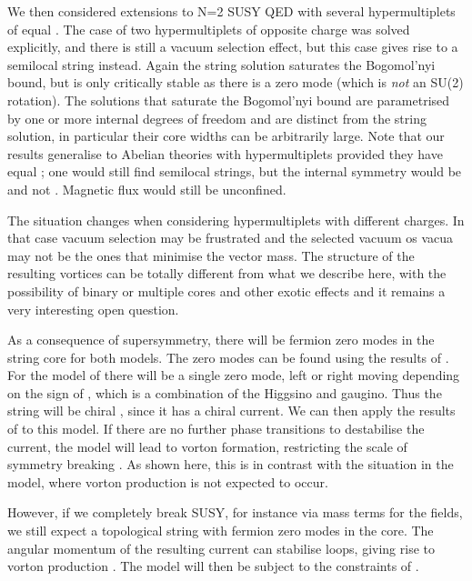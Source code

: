 \documentclass[a4paper,aps,prd,superscriptaddress,floats]{revtex4}
\begin{document}
We then considered extensions to N=2 SUSY QED with several
hypermultiplets of equal \coordHE{}. The case of two hypermultiplets of
opposite charge was solved explicitly, and there is still a vacuum selection
effect, but this case gives rise to a semilocal string  instead. Again
the string solution saturates the Bogomol'nyi bound, but is only 
critically stable as there is a zero mode (which is {\textit {not}} an SU(2) rotation). 
The solutions that saturate 
the Bogomol'nyi bound are parametrised by one or more internal 
degrees of freedom and are distinct from the string solution, 
in particular their core widths can be arbitrarily large. 
Note that our \coordHE{} results generalise to Abelian theories with \coordHE{}  
hypermultiplets provided they have equal \coordHE{}; one would still find
 semilocal strings, but the internal symmetry would be \coordHE{} 
and not \coordHE{} \cite{m93}. Magnetic flux would still be unconfined. 

The situation changes when considering hypermultiplets with different charges. In that case vacuum selection may be frustrated and the selected vacuum os vacua may not be the ones that minimise the vector mass. The structure of the resulting vortices can be totally different from what we describe here, with the possibility of binary or multiple cores and other exotic effects and it remains a very interesting open question. 

As a consequence of supersymmetry, there will be fermion zero
modes in the string core for both models.  The zero modes can be found
using the results of \cite{DDT97}.  For the model of \cite{PRTT96}
there will be a single zero mode, left or right moving depending on
the sign of \coordHE{}, which is a combination of the Higgsino and
gaugino. Thus the string will be chiral \cite{chiralstring}, since it
has a chiral current. We can then apply the results of
\cite{chiralvorton} to this model.  If there are no further phase
transitions to destabilise the current, the model will lead to vorton
formation, restricting the scale of symmetry breaking
\cite{chiralvorton}.  As shown here, this is in contrast with the
situation in the \coordHE{} model, where vorton production is not expected
to occur.

However, if we completely break SUSY, for instance via mass terms for the \coordHE{} fields, we still expect a topological string with fermion zero modes in the core. The angular momentum of the resulting current can stabilise loops, giving rise to vorton production \cite{ADPU02}. The
model will then be subject to the constraints of \cite{chiralvorton}.
\end{document}
